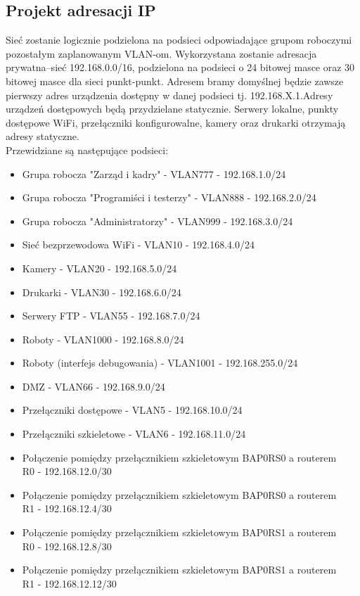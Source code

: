 \documentclass[12pt,a4paper,titlepage]{article}
\begin{document}
\subsection{Projekt adresacji IP} Sieć  zostanie  logicznie  podzielona  na  podsieci  odpowiadające  grupom  roboczymi pozostałym zaplanowanym VLAN-om. Wykorzystana zostanie adresacja prywatna–sieć 192.168.0.0/16, podzielona na podsieci o 24 bitowej masce oraz 30 bitowej masce dla sieci punkt-punkt. Adresem bramy domyślnej będzie zawsze pierwszy adres urządzenia dostępny w  danej  podsieci  tj.  192.168.X.1.Adresy  urządzeń  dostępowych  będą  przydzielane statycznie. Serwery lokalne, punkty dostępowe WiFi, przełączniki konfigurowalne, kamery oraz drukarki otrzymają adresy statyczne.\\
Przewidziane są następujące podsieci:
\begin{itemize}
    \item Grupa robocza "Zarząd i kadry"  -  VLAN777 - 192.168.1.0/24
    \item Grupa robocza "Programiści i testerzy"  -  VLAN888 - 192.168.2.0/24
    \item Grupa robocza "Administratorzy" -  VLAN999 - 192.168.3.0/24
    \item Sieć bezprzewodowa WiFi -  VLAN10 - 192.168.4.0/24
    \item Kamery  -  VLAN20 - 192.168.5.0/24
    \item Drukarki - VLAN30 - 192.168.6.0/24
    \item Serwery FTP  - VLAN55 - 192.168.7.0/24
    \item Roboty  -  VLAN1000 - 192.168.8.0/24
    \item Roboty (interfejs debugowania) - VLAN1001 - 192.168.255.0/24
    \item DMZ - VLAN66 - 192.168.9.0/24
    \item Przełączniki dostępowe - VLAN5 - 192.168.10.0/24
    \item Przełączniki szkieletowe - VLAN6 - 192.168.11.0/24
    
    
    \item Połączenie pomiędzy przełącznikiem szkieletowym BAP0RS0 a routerem\\R0 - 192.168.12.0/30
    \item Połączenie pomiędzy przełącznikiem szkieletowym BAP0RS0 a routerem\\R1 - 192.168.12.4/30
    \item Połączenie pomiędzy przełącznikiem szkieletowym BAP0RS1 a routerem\\R0 - 192.168.12.8/30
    \item Połączenie pomiędzy przełącznikiem szkieletowym BAP0RS1 a routerem\\R1 - 192.168.12.12/30
\end{itemize}
\end{document}
